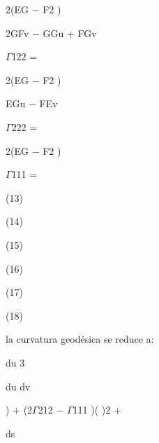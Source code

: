 \documentclass[a4paper,portrait,12pt]{article}
\begin{document}
\begin{flushleft}
2(EG $-$ F2 )
\end{flushleft}


\begin{flushleft}
2GFv $-$ GGu + FGv
\end{flushleft}


\begin{flushleft}
$\Gamma$122 =
\end{flushleft}


\begin{flushleft}
2(EG $-$ F2 )
\end{flushleft}


\begin{flushleft}
EGu $-$ FEv
\end{flushleft}


\begin{flushleft}
$\Gamma$222 =
\end{flushleft}


\begin{flushleft}
2(EG $-$ F2 )
\end{flushleft}


\begin{flushleft}
$\Gamma$111 =
\end{flushleft}





(13)


(14)


(15)


(16)


(17)


(18)





\begin{flushleft}
\newpage
la curvatura geodésica se reduce a:
\end{flushleft}


\begin{flushleft}
du 3
\end{flushleft}


\begin{flushleft}
du dv
\end{flushleft}


\begin{flushleft}
) + (2$\Gamma$212 $-$ $\Gamma$111 )( )2 +
\end{flushleft}


\begin{flushleft}
ds
\end{flushleft}
\end{document}
